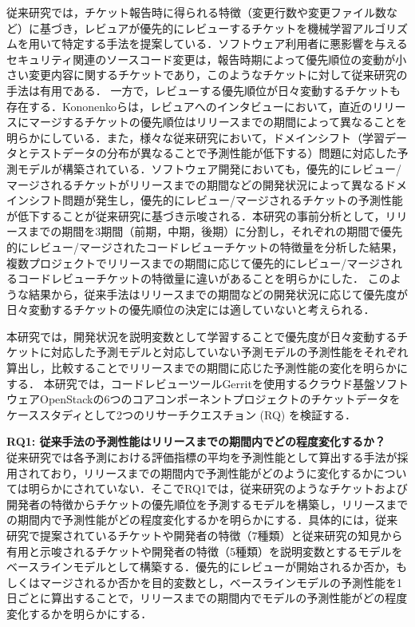 \documentclass[11pt]{jreport}
\newcommand{\rqone}{従来手法の予測性能はリリースまでの期間内でどの程度変化するか？}
\begin{document}
従来研究では，チケット報告時に得られる特徴（変更行数や変更ファイル数など）に基づき，レビュアが優先的にレビューするチケットを機械学習アルゴリズムを用いて特定する手法を提案している\cite{prioritizer}\cite{review_prioritize_pineapple}．ソフトウェア利用者に悪影響を与えるセキュリティ関連のソースコード変更は，報告時期によって優先順位の変動が小さい変更内容に関するチケットであり，このようなチケットに対して従来研究の手法は有用である．
一方で，レビューする優先順位が日々変動するチケットも存在する．Kononenkoらは，レビュアへのインタビューにおいて，直近のリリースにマージするチケットの優先順位はリリースまでの期間によって異なることを明らかにしている\cite{release_merge}．また，様々な従来研究において，ドメインシフト（学習データとテストデータの分布が異なることで予測性能が低下する）問題に対応した予測モデルが構築されている\cite{domain1}\cite{domain2}．ソフトウェア開発においても，優先的にレビュー/マージされるチケットがリリースまでの期間などの開発状況によって異なるドメインシフト問題が発生し，優先的にレビュー/マージされるチケットの予測性能が低下することが従来研究\cite{release_merge}に基づき示唆される．本研究の事前分析として，リリースまでの期間を3期間（前期，中期，後期）に分割し，それぞれの期間で優先的にレビュー/マージされたコードレビューチケットの特徴量を分析した結果，複数プロジェクトでリリースまでの期間に応じて優先的にレビュー/マージされるコードレビューチケットの特徴量に違いがあることを明らかにした．
このような結果から，従来手法はリリースまでの期間などの開発状況に応じて優先度が日々変動するチケットの優先順位の決定には適していないと考えられる．

本研究では，開発状況を説明変数として学習することで優先度が日々変動するチケットに対応した予測モデルと対応していない予測モデルの予測性能をそれぞれ算出し，比較することでリリースまでの期間に応じた予測性能の変化を明らかにする．
本研究では，コードレビューツールGerritを使用するクラウド基盤ソフトウェアOpenStackの6つのコアコンポーネントプロジェクトのチケットデータをケーススタディとして2つのリサーチクエスチョン (RQ) を検証する．

\noindent\textbf{RQ1: \rqone}\\
従来研究\cite{prioritizer}では各予測における評価指標の平均を予測性能として算出する手法が採用されており，リリースまでの期間内で予測性能がどのように変化するかについては明らかにされていない．そこでRQ1では，従来研究\cite{prioritizer}のようなチケットおよび開発者の特徴からチケットの優先順位を予測するモデルを構築し，リリースまでの期間内で予測性能がどの程度変化するかを明らかにする．具体的には，従来研究\cite{prioritizer}で提案されているチケットや開発者の特徴（7種類）と従来研究\cite{release_merge}\cite{review1}の知見から有用と示唆されるチケットや開発者の特徴（5種類）を説明変数とするモデルをベースラインモデルとして構築する．優先的にレビューが開始されるか否か，もしくはマージされるか否かを目的変数とし，ベースラインモデルの予測性能を1日ごとに算出することで，リリースまでの期間内でモデルの予測性能がどの程度変化するかを明らかにする．
\end{document}
